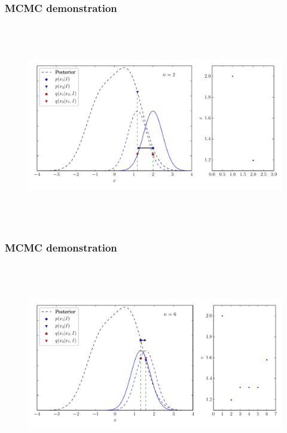 \begin{frame}

\frametitle{MCMC demonstration}
\label{mcmcdemonstration}

\begin{figure}[htbp]
\centering
\includegraphics[keepaspectratio,width=\textwidth,height=250pt]{figures/mcmc_example_1.pdf}
\label{mcmc_example_1}
\end{figure}

\end{frame}

\begin{frame}

\frametitle{MCMC demonstration}
\label{mcmcdemonstration}

\begin{figure}[htbp]
\centering
\includegraphics[keepaspectratio,width=\textwidth,height=250pt]{figures/mcmc_example_2.pdf}
\label{mcmc_example_2}
\end{figure}

\end{frame}

